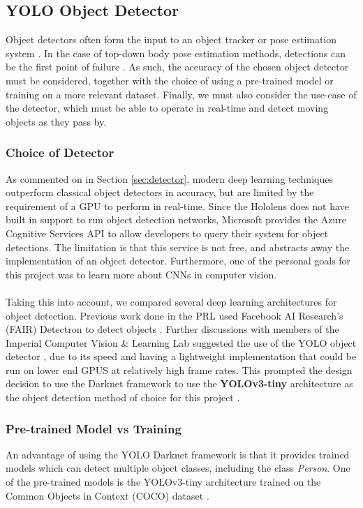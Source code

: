 \subsection{YOLO Object Detector}
Object detectors often form the input to an object tracker or pose estimation system \cite{Bewley2016, Jin2017}. In the case of top-down body pose estimation methods, detections can be the first point of failure \cite{Insafutdinov}. As such, the accuracy of the chosen object detector must be considered, together with the choice of using a pre-trained model or training on a more relevant dataset. Finally, we must also consider the use-case of the detector, which must be able to operate in real-time and detect moving objects as they pass by.

\subsubsection{Choice of Detector}
As commented on in Section \ref{sec:detector}, modern deep learning techniques outperform classical object detectors in accuracy, but are limited by the requirement of a GPU to perform in real-time. Since the Hololens does not have built in support to run object detection networks, Microsoft provides the Azure Cognitive Services API to allow developers to query their system for object detections. The limitation is that this service is not free, and abstracts away the implementation of an object detector. Furthermore, one of the personal goals for this project was to learn more about CNNs in computer vision.

\paragraph{} Taking this into account, we compared several deep learning architectures for object detection. Previous work done in the PRL used Facebook AI Research's (FAIR) Detectron to detect objects \cite{Chacon-Quesada, Detectron2018, Rena}. Further discussions with members of the Imperial Computer Vision \& Learning Lab suggested the use of the YOLO object detector \cite{Redmon}, due to its speed and having a lightweight implementation that could be run on lower end GPUS at relatively high frame rates. This prompted the design decision to use the Darknet framework to use the \textbf{YOLOv3-tiny} architecture as the object detection method of choice for this project \cite{Redmon2018}.

\subsubsection{Pre-trained Model vs Training}
An advantage of using the YOLO Darknet framework is that it provides trained models which can detect multiple object classes, including the class \textit{Person}. One of the pre-trained models is the YOLOv3-tiny architecture trained on the Common Objects in Context (COCO) dataset \cite{Lin}.

